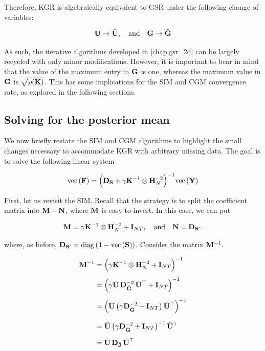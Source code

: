 Therefore, KGR is algebraically equivalent to GSR under the following change of variables:

$$
\mathbf{U} \rightarrow \bar{\mathbf{U}}, \quad \text{and} \quad \mathbf{G} \rightarrow \bar{\mathbf{G}}
$$

As such, the iterative algorithms developed in \cref{chap:gsr_2d} can be largely recycled with only minor modifications. However, it is important to bear in mind that the value of the maximum entry in $\mathbf{G}$ is one, whereas the maximum value in $\bar{\mathbf{G}}$ is $\sqrt{\rho(\mathbf{K})}$. This has some implications for the SIM and CGM convergence rate, as explored in the following sections. 
 

\subsection{Solving for the posterior mean}

We now briefly restate the SIM and CGM algorithms to highlight the small changes necessary to accommodate KGR with arbitrary missing data. The goal is to solve the following linear system 

\begin{equation}
    \label{eq:lin_system_kgr}
    \text{\textup{vec}}\left(\mathbf{F}\right) = \Big(\mathbf{D}_{\mathbf{S}} + \gamma \mathbf{K}^{-1} \otimes \mathbf{H}_N^{-2}\Big)^{-1} \text{\textup{vec}}\left(\mathbf{Y}\right)
\end{equation}

First, let us revisit the SIM. Recall that the strategy is to split the coefficient matrix into $\mathbf{M} - \mathbf{N}$, where $\mathbf{M}$ is easy to invert. In this case, we can put

\begin{equation}
    \mathbf{M} = \gamma \mathbf{K}^{-1} \otimes \mathbf{H}_N^{-2} + \mathbf{I}_{NT}, \quad \text{and} \quad \mathbf{N} = \mathbf{D}_{\mathbf{S}'}.
\end{equation}

where, as before, $\mathbf{D}_{\mathbf{S}'} = \text{\textup{diag}}\left(\mathbf{1} - \text{\textup{vec}}\left(\mathbf{S}\right)\right)$. Consider the matrix $\mathbf{M}^{-1}$.

\begin{align}
    \label{eq:M_inv_kgr}
    \mathbf{M}^{-1} &= \Big(\gamma \mathbf{K}^{-1} \otimes \mathbf{H}_N^{-2} + \mathbf{I}_{NT}\Big)^{-1} \notag \\[0.15cm]
    &= \Big(\gamma \bar{\mathbf{U}} \, \mathbf{D}_{\bar{\mathbf{G}}}^{-2} \, \bar{\mathbf{U}}^\top + \mathbf{I}_{NT}\Big)^{-1} \notag \\[0.2cm]
    &= \Big(\bar{\mathbf{U}} \, \big( \gamma \mathbf{D}_{\bar{\mathbf{G}}}^{-2} + \mathbf{I}_{NT} \big) \, \bar{\mathbf{U}}^\top\Big)^{-1} \notag \\[0.25cm]
    &= \bar{\mathbf{U}} \, \big( \gamma \mathbf{D}_{\bar{\mathbf{G}}}^{-2} + \mathbf{I}_{NT} \big)^{-1} \, \bar{\mathbf{U}}^\top \notag \\[0.2cm]
    &= \bar{\mathbf{U}} \, \mathbf{D}_{\bar{\mathbf{J}}} \, \bar{\mathbf{U}}^\top 
\end{align}

